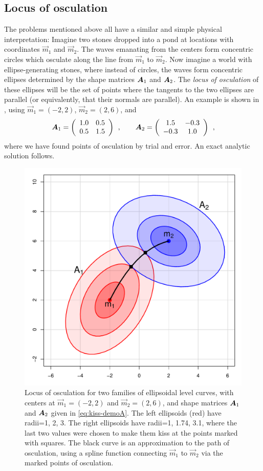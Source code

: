 \subsection{Locus of osculation}\label{sec:locus}
The problems mentioned above all have a similar and simple physical interpretation:  Imagine two stones dropped
into a pond at locations with coordinates $\vec{m}_1$ and $\vec{m}_2$.  The waves emanating from the centers
form concentric circles which osculate along the line from $\vec{m}_1$ to $\vec{m}_2$.
Now imagine a world with ellipse-generating stones, where instead of circles, the waves form concentric ellipses determined by
the shape matrices $\bm{A}_1$ and $\bm{A}_2$.
The \emph{locus of osculation} of these ellipses will be the set of points where the tangents
to the two ellipses are parallel (or equivalently, that their normals are parallel).  An
example is shown in , using $\vec{m}_1 = (-2, 2)$, $\vec{m}_2 = (2, 6)$, and
\begin{equation} \label{eq:kiss-demoA}
\bm{A}_1 = \left(
\begin{array}{cc}
 1.0 & 0.5 \\ 0.5 & 1.5
\end{array}
\right)
\:\: ,\quad\quad
\bm{A}_2 =\left(
\begin{array}{cc}
 1.5 & -0.3 \\ -0.3 & 1.0
\end{array}
\right) \:\: ,
\end{equation}
where we have found points of osculation by trial and error.  An exact analytic solution follows.

\begin{figure}[htb!]
  \centering
  \includegraphics[width=.6\textwidth,clip]{fig/kiss-demo}
  \caption{Locus of osculation for two families of ellipsoidal level curves, with centers at $\vec{m}_1 = (-2, 2)$ and  $\vec{m}_2 = (2, 6)$,
  and shape matrices $\bm{A}_1$ and $\bm{A}_2$ given in \eqref{eq:kiss-demoA}.
  The left ellipsoids (red) have radii=1, 2, 3. The right ellipsoids
  have radii=1, 1.74, 3.1, where the last two values were chosen to make them kiss at the points marked with squares. The black curve is an
  approximation to the path of osculation, using a
  spline function connecting $\vec{m}_1$ to $\vec{m}_2$ via the marked points of osculation.}%
  \label{fig:kiss-demo}
\end{figure}

